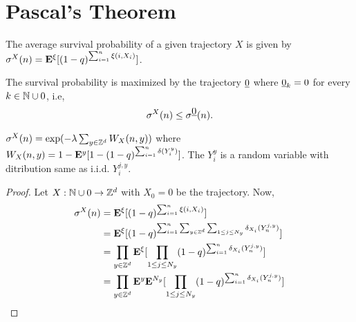 \documentclass[main]{subfiles}
\begin{document}
\section{Pascal's Theorem}
The average survival probability of a given trajectory $X$ is given by $\sigma^X(n)=\mathbf E^\xi[(1-q)^{\sum_{i=1}^{n}\xi(i,X_i)}]$.
\begin{theorem}[Pascal]
    The survival probability is maximized by the trajectory $\zero$ where $\zero_k=0$ for every $k \in \mathbb N\cup{0}$, i.e,
    $$\sigma^X(n)\leq \sigma^\zero(n).$$
\end{theorem}
\begin{lemma}
    $\sigma^X(n)=\exp (-\lambda \sum_{y \in \mathbb Z^d}W_X(n,y))$ where $W_X(n,y)=1-\mathbf E^y[1-(1-q)^{\sum_{i=1}^{n}\delta(Y_i^y)}]$. The $Y_i^y$ is a random variable with ditribution same as i.i.d. $Y_i^{j,y}$.
\end{lemma}
\begin{proof}
    Let $X:\mathbb N\cup {0} \rightarrow \mathbb Z^d$ with $X_0=0$ be the trajectory.
    Now,
    \begin{equation*}
        \begin{aligned}
            \sigma^X(n) & =\mathbf E^\xi[(1-q)^{\sum_{i=1}^{n}\xi(i,X_i)}]                                                              \\
                        & =\mathbf E^\xi[(1-q)^{\sum_{i=1}^{n}\sum_{y \in \mathbb Z^d}\sum_{1\leq j \leq N_y} \delta_{X_i}(Y^{j,y}_n)}]        \\
                        & =\prod_{y \in \mathbb Z^d}\mathbf E^\xi[\prod_{1\leq j \leq N_y}(1-q)^{\sum_{i=1}^{n}\delta_{X_i}(Y^{j,y}_n)}]       \\
                        & =\prod_{y \in \mathbb Z^d}\mathbf E^y\mathbf E^{N_y}[\prod_{1\leq j \leq N_y}(1-q)^{\sum_{i=1}^{n}\delta_{X_i}(Y^{j,y}_n)}]
        \end{aligned}
    \end{equation*}
\end{proof}
\end{document}
